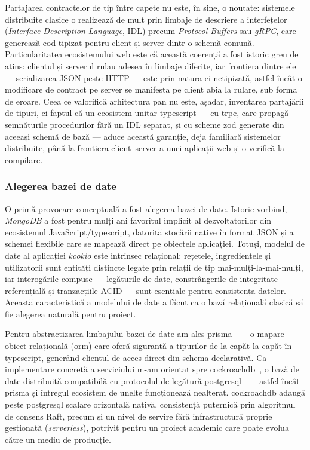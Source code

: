Partajarea contractelor de tip între capete nu este, în sine, o noutate: sistemele distribuite clasice o realizează de mult prin limbaje de descriere a interfețelor (\textit{Interface Description Language}, IDL) precum \textit{Protocol Buffers} sau \textit{gRPC}, care generează cod tipizat pentru client și server dintr-o schemă comună. Particularitatea ecosistemului \gls{web} este că această coerență a fost istoric greu de atins: clientul și serverul rulau adesea în limbaje diferite, iar frontiera dintre ele --- serializarea JSON peste HTTP --- este prin natura ei netipizată, astfel încât o modificare de contract pe server se manifesta pe client abia la rulare, sub formă de eroare. Ceea ce valorifică arhitectura \gls{pan} nu este, așadar, inventarea partajării de tipuri, ci faptul că un ecosistem unitar \gls{typescript} --- cu \acrshort{trpc}, care propagă semnăturile procedurilor fără un IDL separat, și cu scheme \gls{zod} generate din aceeași schemă de bază --- aduce această garanție, deja familiară sistemelor distribuite, până la frontiera client--server a unei aplicații web și o verifică la compilare.

\subsubsection*{Alegerea bazei de date}

O primă provocare conceptuală a fost alegerea bazei de date.
Istoric vorbind, \textit{MongoDB} a fost pentru mulți ani favoritul implicit al dezvoltatorilor din ecosistemul JavaScript/\gls{typescript}, datorită stocării native în format JSON și a schemei flexibile care se mapează direct pe obiectele aplicației.
Totuși, modelul de date al aplicației \textit{\gls{kookio}} este intrinsec relațional: rețetele, ingredientele și utilizatorii sunt entități distincte legate prin relații de tip mai-mulți-la-mai-mulți, iar interogările compuse --- legăturile de date, constrângerile de integritate referențială și tranzacțiile ACID --- sunt esențiale pentru consistența datelor.
Această caracteristică a modelului de date a făcut ca o bază relațională clasică să fie alegerea naturală pentru proiect.

Pentru abstractizarea limbajului bazei de date am ales \gls{prisma}~\cite{prisma_orm} --- o mapare obiect-relațională (\acrshort{orm}) care oferă siguranță a tipurilor de la capăt la capăt în \gls{typescript}, generând clientul de acces direct din schema declarativă.
Ca implementare concretă a serviciului m-am orientat spre \gls{cockroachdb}~\cite{cockroachdb}, o bază de date distribuită compatibilă cu protocolul de legătură \gls{postgresql}~\cite{postgresql} --- astfel încât \gls{prisma} și întregul ecosistem de unelte funcționează nealterat.
\gls{cockroachdb} adaugă peste \gls{postgresql} scalare orizontală nativă, consistență puternică prin algoritmul de consens Raft, precum și un nivel de servire fără infrastructură proprie gestionată (\textit{serverless}), potrivit pentru un proiect academic care poate evolua către un mediu de producție.

